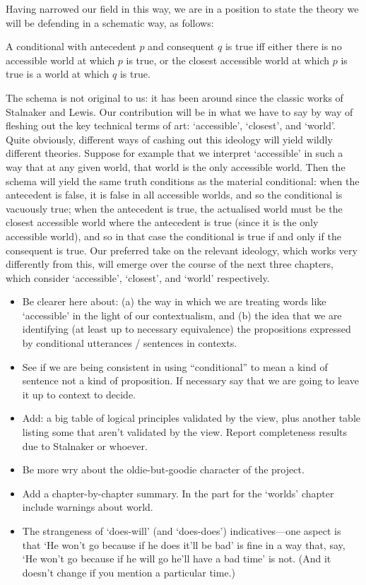 \documentclass[If.tex]{subfiles}
\begin{document}
Having narrowed our field in this way, we are in a position to state the theory we will be defending in a schematic way, as follows:
\begin{prop} 
	\item
	A conditional with antecedent $p$ and consequent $q$ is true iff either there is no accessible world at which $p$ is true, or the closest accessible world at which $p$ is true is a world at which $q$ is true. 
\end{prop}
The schema is not original to us: it has been around since the classic works of Stalnaker and Lewis. Our contribution will be in what we have to say by way of fleshing out the key technical terms of art: ‘accessible’, ‘closest’, and ‘world’. Quite obviously, different ways of cashing out this ideology will yield wildly different theories. Suppose for example that we interpret ‘accessible’ in such a way that at any given world, that world is the only accessible world. Then the schema will yield the same truth conditions as the material conditional: when the antecedent is false, it is false in all accessible worlds, and so the conditional is vacuously true; when the antecedent is true, the actualised world must be the closest accessible world where the antecedent is true (since it is the only accessible world), and so in that case the conditional is true if and only if the consequent is true. Our preferred take on the relevant ideology, which works very differently from this, will emerge over the course of the next three chapters, which consider ‘accessible’, ‘closest’, and ‘world’ respectively.

\begin{itemize} 
	\item Be clearer here about: (a) the way in which we are treating words like ‘accessible’ in the light of our contextualism, and (b) the idea that we are identifying (at least up to necessary equivalence) the propositions expressed by conditional utterances / sentences in contexts. 
	\item See if we are being consistent in using “conditional” to mean a kind of sentence not a kind of proposition. If necessary say that we are going to leave it up to context to decide. 
	\item Add: a big table of logical principles validated by the view, plus another table listing some that aren't validated by the view. Report completeness results due to Stalnaker or whoever. 
	\item Be more wry about the oldie-but-goodie character of the project. 
	\item
	Add a chapter-by-chapter summary.  In the part for the ‘worlds’ chapter include warnings about world.
	\item
	The strangeness of ‘does-will’ (and ‘does-does’) indicatives---one aspect is that ‘He won't go because if he does it'll be bad’ is fine in a way that, say, ‘He won't go because if he will go he'll have a bad time’ is not.  (And it doesn't change if you mention a particular time.)
\end{itemize}
\end{document}
